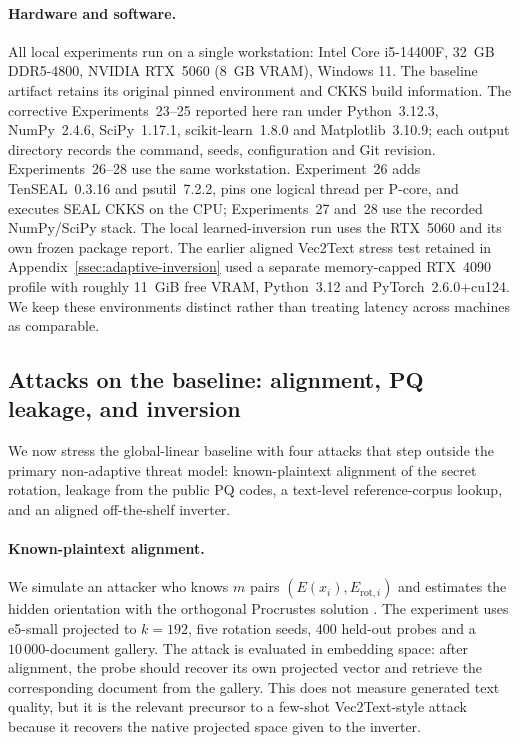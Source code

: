 \paragraph{Hardware and software.} All local experiments run on a single
workstation: Intel Core i5-14400F, 32~GB DDR5-4800, NVIDIA RTX~5060
(8~GB VRAM), Windows 11. The baseline artifact retains its original pinned
environment and CKKS build information. The corrective Experiments~23--25
reported here ran under Python~3.12.3, NumPy~2.4.6, SciPy~1.17.1,
scikit-learn~1.8.0 and Matplotlib~3.10.9; each output directory records the
command, seeds, configuration and Git revision. Experiments~26--28 use the
same workstation. Experiment~26 adds TenSEAL~0.3.16 and psutil~7.2.2, pins one
logical thread per P-core, and executes SEAL CKKS on the CPU; Experiments~27
and~28 use the recorded NumPy/SciPy stack. The local learned-inversion run
uses the RTX~5060 and its own frozen package report. The earlier aligned
Vec2Text stress test retained in Appendix~\ref{ssec:adaptive-inversion} used
a separate memory-capped RTX~4090 profile with roughly 11~GiB free VRAM,
Python~3.12 and PyTorch~2.6.0+cu124. We keep these environments distinct
rather than treating latency across machines as comparable.

\subsection{Attacks on the baseline: alignment, PQ leakage, and inversion}\label{ssec:alignment-pq}

We now stress the global-linear baseline with four attacks that step outside
the primary non-adaptive threat model: known-plaintext alignment of the
secret rotation, leakage from the public PQ codes, a text-level
reference-corpus lookup, and an aligned off-the-shelf inverter.

\paragraph{Known-plaintext alignment.} We simulate an attacker who knows
$m$ pairs $(E(x_i), E_{\mathrm{rot},i})$ and estimates the hidden
orientation with the orthogonal Procrustes solution
\cite{ref_schonemann}. The experiment uses e5-small projected to
$k=192$, five rotation seeds, $400$ held-out probes and a
$10\,000$-document gallery. The attack is evaluated in embedding space:
after alignment, the probe should recover its own projected vector and
retrieve the corresponding document from the gallery. This does not
measure generated text quality, but it is the relevant precursor to a
few-shot Vec2Text-style attack because it recovers the native projected
space given to the inverter.

